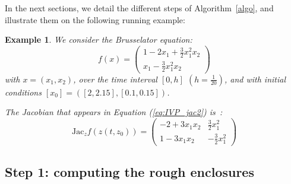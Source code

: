 \documentclass{sig-alternate-05-2015}
\newcommand\ForAuthors[1]%
 {\par\smallskip                     %
  \begin{center}%
   \fbox%
   {\parbox{0.9\linewidth}%
    {\raggedright\sc--- #1}%
   }%
  \end{center}%
  \par\smallskip                     %
 }
\newtheorem{example}{Example}
\def\intvl#1{\mbox{$[ #1 ]$}}
\begin{document}
In the next sections, we detail the different steps of Algorithm~\ref{algo}, and illustrate them on the following running example:
\begin{example}
\label{running0}
\label{running1}
We consider the Brusselator equation: 
$$ f(x) = \left(\begin{array}{l}
1-2 x_1+\frac{3}{2} x_1^2 x_2 \\
x_1-\frac{3}{2} x_1^2x_2
\end{array}\right)$$
\noindent with $x=(x_1,x_2)$, over the time interval $\left[0,h\right]$ 
$\left(h=\frac{1}{20}\right)$, and with initial conditions
$\intvl{x_0}=\left([2, 2.15],[0.1, 0.15]\right)$.

The Jacobian that appears in Equation (\ref{eq:IVP_jac2}) is~: 
$$
\mbox{Jac}_z f(z(t,z_0)) = \left(\begin{array}{cc} 
-2+3x_1x_2  & \frac{3}{2} x^2_1 \\
1-3x_1x_2 & -\frac{3}{2} x^2_1
\end{array}\right)
$$
\end{example}

\subsection{Step 1: computing the rough enclosures}
\label{roughenc}
\end{document}
